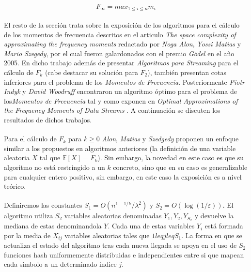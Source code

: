 \documentclass{subfiles}
\begin{document}
      \begin{equation}
      \label{eq:frecuency_moments_max}
        F_\infty = max_{1 \leq i \leq n} m_i
      \end{equation}

      \paragraph{}
      El resto de la sección trata sobre la exposición de los algoritmos para el cálculo de los momentos de frecuencia descritos en el articulo \emph{The space complexity of approximating the frequency moments} \cite{alon1996space} redactado por \emph{Noga Alon}, \emph{Yossi Matias} y \emph{Mario Szegedy}, por el cual fueron galardonados con el premio \emph{Gödel} en el año 2005. En dicho trabajo además de presentar \emph{Algoritmos para Streaming} para el cálculo de $F_k$ (cabe destacar su solución para $F_2$), también presentan cotas inferiores para el problema de los \emph{Momentos de Frecuencia}. Posteriormente \emph{Piotr Indyk} y \emph{David Woodruff} encontraron un algoritmo óptimo para el problema de los\emph{Momentos de Frecuencia} tal y como exponen en \emph{Optimal Approximations of the Frequency Moments of Data Streams} \cite{indyk2005optimal}. A continuación se discuten los resultados de dichos trabajos.

      \paragraph{}
      Para el cálculo de $F_k$ para $k \geq 0$ \emph{Alon}, \emph{Matias} y \emph{Szedgedy} proponen un enfoque similar a los propuestos en algoritmos anteriores (la definición de una variable aleatoria $X$ tal que $\mathbb{E}[X] = F_k$). Sin embargo, la novedad en este caso es que su algoritmo no está restringido a un $k$ concreto, sino que en su caso es generalizable para cualquier entero positivo, sin embargo, en este caso la exposición es a nivel teórico.

      \paragraph{}
      Definiremos las constantes $S_1 =O(n^{1-1/k}/\lambda ^{2})$ y $S_2 = O(\log(1/\varepsilon ))$. El algoritmo utiliza $S_2$ variables aleatorias denominadas $Y_1, Y_2, Y_{S_2}$ y devuelve la mediana de estas denominandola $Y$. Cada una de estas variables $Y_i$ está formada por la media de $X_{ij}$ variables aleatorias tales que $1 leq j leq S_1$. La forma en que se actualiza el estado del algoritmo tras cada nueva llegada se apoya en el uso de $S_2$ funciones hash uniformemente distribuidas e independientes entre si que mapean cada símbolo a un determinado indice $j$.
\end{document}

